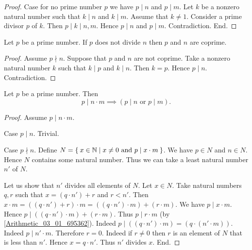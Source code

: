 \documentclass[../../natural-numbers.ftl.tex]{subfiles}
\begin{document}
\begin{forthel}
\begin{proof}
      Case for no prime number $p$ we have $p \mid n$ and $p \mid m$.
        Let $k$ be a nonzero natural number such that $k \mid n$ and $k \mid m$.
        Assume that $k \neq 1$.
        Consider a prime divisor $p$ of $k$.
        Then $p \mid k \mid n,m$.
        Hence $p \mid n$ and $p \mid m$.
        Contradiction.
      End.
    \end{proof}

    \begin{proposition}\label{Arithmetic_03_04_691058}
      Let $p$ be a prime number.
      If $p$ does not divide $n$ then $p$ and $n$ are coprime.
    \end{proposition}
    \begin{proof}
      Assume $p \nmid n$.
      Suppose that $p$ and $n$ are not coprime.
      Take a nonzero natural number $k$ such that $k \mid p$ and $k \mid n$.
      Then $k = p$.
      Hence $p \mid n$.
      Contradiction.
    \end{proof}

    \begin{proposition}\label{Arithmetic_03_04_703692}
      Let $p$ be a prime number.
      Then \[ p \mid n \cdot m \implies (\text{$p \mid n$ or $p \mid m$}). \]
    \end{proposition}
    \begin{proof}
      Assume $p \mid n \cdot m$.

      Case $p \mid n$. Trivial.

      Case $p \nmid n$.
        Define $N = \Set{x \in \mathbb{N} | \text{$x \neq 0$ and $p \mid x \cdot m$}}$.
        We have $p \in N$ and $n \in N$.
        Hence $N$ contains some natural number.
        Thus we can take a least natural number $n'$ of $N$.

        Let us show that $n'$ divides all elements of $N$.
          Let $x \in N$.
          Take natural numbers $q,r$ such that $x = (q \cdot n') + r$ and $r < n'$.
          Then $x \cdot m = ((q \cdot n') + r) \cdot m = ((q \cdot n') \cdot m) + (r \cdot m)$.
          We have $p \mid x \cdot m$.
          Hence $p \mid ((q \cdot n') \cdot m) + (r \cdot m)$.
          Thus $p \mid r \cdot m$ (by \ref{Arithmetic_03_01_695362}).
          Indeed $p \mid ((q \cdot n') \cdot m) = (q \cdot (n' \cdot m))$.
          Indeed $p \mid n' \cdot m$.
          Therefore $r = 0$.
          Indeed if $r \neq 0$ then $r$ is an element of $N$ that is less than $n'$.
          Hence $x = q \cdot n'$.
          Thus $n'$ divides $x$.
        End.


\end{proof}
\end{forthel}
\end{document}
